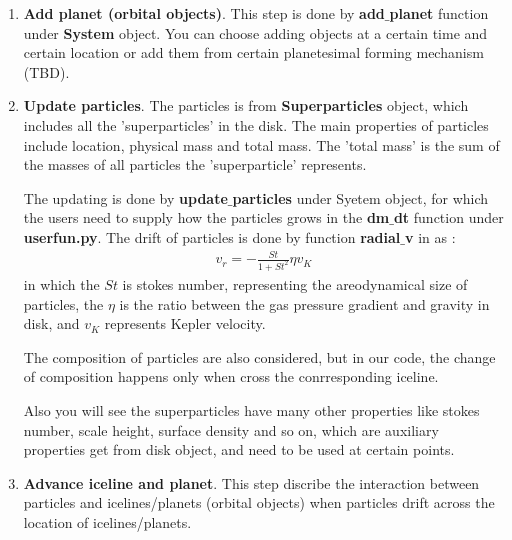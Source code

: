 \documentclass[12pt]{article}
\begin{document}
\begin{enumerate}
    \item \textbf{Add planet (orbital objects)}. This step is done by \textbf{add$\_$planet} function 
        under \textbf{System} object.
        You can choose adding objects at a certain time and certain location or 
        add them from certain planetesimal forming mechanism (TBD). 
    \item \textbf{Update particles}. The particles is from \textbf{Superparticles} object, which 
        includes all the 'superparticles' in the disk. The main properties of particles 
        include location, physical mass and total mass. The 'total mass' is the sum 
        of the masses of all particles the 'superparticle' represents. 

        The updating is done by \textbf{update$\_$particles} under Syetem object, for 
        which the users need to supply how the particles grows in the 
        \textbf{dm$\_$dt} function under \textbf{userfun.py}. The drift of particles is 
        done by function \textbf{radial$\_$v} in  as 
        \citep{Whipple1972,AdachiEtal1976,Weidenschilling1980}:
        \begin{align}
            v_r = -\frac{St}{1+St^2} \eta v_K 
        \end{align}
        in which the $St$ is stokes number, representing the areodynamical size of particles, 
        the $\eta$ is the ratio between the gas pressure gradient and gravity in disk, and 
        $v_K$ represents Kepler velocity. 

        The composition of particles are also considered, but in our code, the change of 
        composition happens only when cross the conrresponding iceline. 

        Also you will see the superparticles have many other properties like stokes number, 
        scale height, surface density and so on, which are auxiliary properties get from 
        disk object, and need to be used at certain points.
    \item \textbf{Advance iceline and planet}. 
        This step discribe the interaction between particles 
        and icelines/planets (orbital objects) when particles drift across the location of 
        icelines/planets. 


\end{enumerate}
\end{document}
